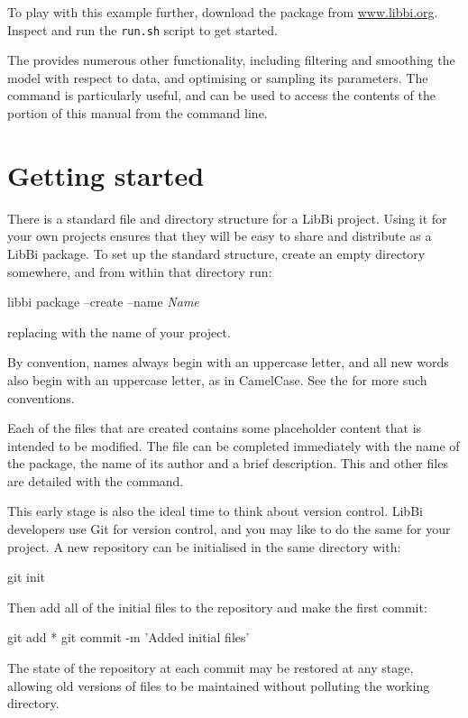 To play with this example further, download the  package from
\url{www.libbi.org}. Inspect and run the \texttt{run.sh} script to get
started.

The  provides numerous
other functionality, including filtering and smoothing the model with respect
to data, and optimising or sampling its parameters. The 
command is particularly useful, and can be used to access the contents of the
 portion of this manual from the
command line.

\section{Getting started}\label{Getting_started}

There is a standard file and directory structure for a LibBi project. Using it
for your own projects ensures that they will be easy to share and distribute
as a LibBi package. To set up the standard structure, create an empty
directory somewhere, and from within that directory run:
\begin{cmdcode}
libbi package --create --name \emph{Name}
\end{cmdcode}
replacing  with the name of your project.

\begin{tip}
By convention, names always begin with an uppercase letter, and all new words
also begin with an uppercase letter, as in CamelCase. See the
 for more such conventions.
\end{tip}

Each of the files that are created contains some placeholder content that is
intended to be modified. The  file can be completed immediately
with the name of the package, the name of its author and a brief
description. This and other files are detailed with the 
command.

This early stage is also the ideal time to think about version control. LibBi
developers use Git for version control, and you may like to do the
same for your project. A new repository can be initialised in the same
directory with:
\begin{cmdcode}
git init
\end{cmdcode}
Then add all of the initial files to the repository and make the first commit:
\begin{cmdcode}
git add *
git commit -m 'Added initial files'
\end{cmdcode}
The state of the repository at each commit may be restored at any stage,
allowing old versions of files to be maintained without polluting the working
directory.

